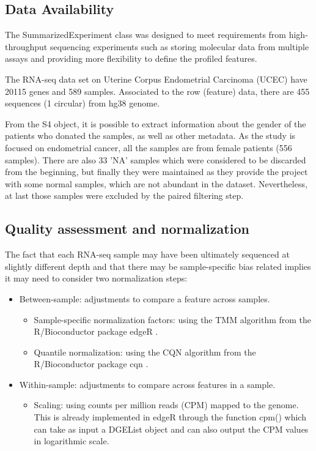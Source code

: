 \documentclass[9pt,twocolumn,twoside]{gsajnl}
\begin{document}
\subsection*{Data Availability}
The SummarizedExperiment \citep{SummarizedExperiment} class was designed to meet requirements from high-throughput sequencing experiments such as storing molecular data from multiple assays and providing more flexibility to define the profiled features.

The RNA-seq data set on Uterine Corpus Endometrial Carcinoma (UCEC) have 20115 genes and 589 samples. Associated to the row (feature) data, there are 455 sequences (1 circular) from hg38 genome.

From the S4 object, it is possible to extract information about the gender of the patients who donated the samples, as well as other metadata. As the study is focused on endometrial cancer, all the samples are from female patients (556 samples). There are also 33 'NA' samples which were considered to be discarded from the beginning, but finally they were maintained as they provide the project with some normal samples, which are not abundant in the dataset. Nevertheless, at last those samples were excluded by the paired filtering step. 

\subsection*{Quality assessment and normalization}
The fact that each RNA-seq sample may have been ultimately sequenced at slightly different depth and that there may be sample-specific bias related implies it may need to consider two normalization steps:
\begin{itemize}
\item Between-sample: adjustments to compare a feature across samples.
\begin{itemize}
\item Sample-specific normalization factors: using the TMM algorithm from the R/Bioconductor package edgeR \citep{Robinson2010b}.
\item Quantile normalization: using the CQN algorithm from the R/Bioconductor package cqn \citep{Hansen2012b}.
\end{itemize}
\item Within-sample: adjustments to compare across features in a sample.
\begin{itemize}
\item Scaling: using counts per million reads (CPM) mapped to the genome. This is already implemented in edgeR \citep{Robinson2010b} through the function cpm() which can take as input a DGEList object and can also output the CPM values in logarithmic scale.
\end{itemize}
\end{itemize}
\end{document}

